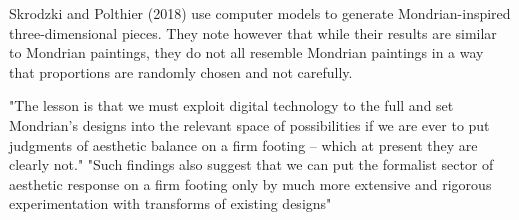 
Skrodzki and Polthier (2018) \cite{Skrodzki2018} use computer models to generate
Mondrian-inspired three-dimensional pieces. They note however that while their
results are similar to Mondrian paintings, they do not all resemble Mondrian
paintings in a way that proportions are randomly chosen and not carefully.



"The lesson is that we must exploit digital technology to the full and set Mondrian's
designs into the relevant space of possibilities if we are ever to put judgments
of aesthetic balance on a firm footing – which at present they are clearly not."
"Such findings also suggest that we can put the formalist sector of aesthetic
response on a firm footing only by much more extensive and rigorous
experimentation with transforms of existing designs"
